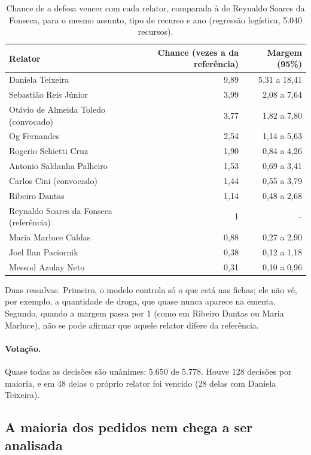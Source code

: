 \begin{table}[h]
\centering\small
\caption{Chance de a defesa vencer com cada relator, comparada à de Reynaldo Soares da
Fonseca, para o mesmo assunto, tipo de recurso e ano (regressão logística, 5.040 recursos).}
\label{tab:dados-regressao}
\begin{tabular}{lrr}
\toprule
Relator & Chance (vezes a da referência) & Margem (95\%) \\
\midrule
Daniela Teixeira & 9,89 & 5,31 a 18,41 \\
Sebastião Reis Júnior & 3,99 & 2,08 a 7,64 \\
Otávio de Almeida Toledo (convocado) & 3,77 & 1,82 a 7,80 \\
Og Fernandes & 2,54 & 1,14 a 5,63 \\
Rogerio Schietti Cruz & 1,90 & 0,84 a 4,26 \\
Antonio Saldanha Palheiro & 1,53 & 0,69 a 3,41 \\
Carlos Cini (convocado) & 1,44 & 0,55 a 3,79 \\
Ribeiro Dantas & 1,14 & 0,48 a 2,68 \\
Reynaldo Soares da Fonseca (referência) & 1 & -- \\
Maria Marluce Caldas & 0,88 & 0,27 a 2,90 \\
Joel Ilan Paciornik & 0,38 & 0,12 a 1,18 \\
Messod Azulay Neto & 0,31 & 0,10 a 0,96 \\
\bottomrule
\end{tabular}
\end{table}

Duas ressalvas. Primeiro, o modelo controla só o que está nas fichas; ele não vê, por exemplo,
a quantidade de droga, que quase nunca aparece na ementa. Segundo, quando a margem passa por 1
(como em Ribeiro Dantas ou Maria Marluce), não se pode afirmar que aquele relator difere da
referência.

\paragraph*{Votação.} Quase todas as decisões são unânimes: 5.650 de 5.778. Houve 128 decisões
por maioria, e em 48 delas o próprio relator foi vencido (28 delas com Daniela Teixeira).

\subsection*{A maioria dos pedidos nem chega a ser analisada}

